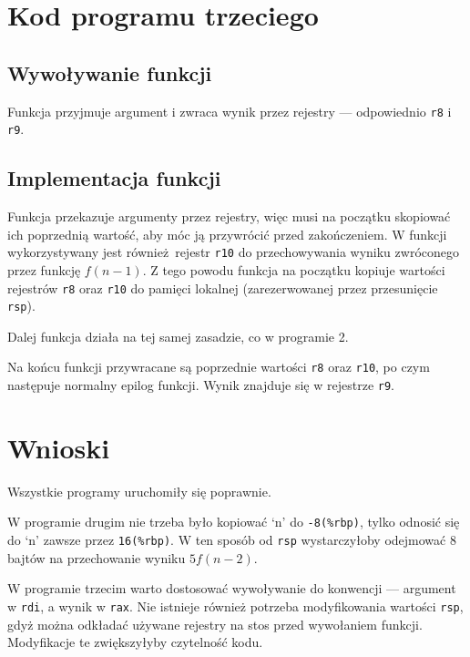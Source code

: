 \documentclass[polish, 11pt]{article}
\begin{document}
\section{Kod programu trzeciego}
	\subsection{Wywoływanie funkcji}

		\begin{minipage}{.5\textwidth}
			Funkcja przyjmuje argument i zwraca wynik przez rejestry --- odpowiednio \texttt{r8} i \texttt{r9}.
		\end{minipage}%
		\hspace{1cm}
		\begin{minipage}{.5\textwidth}
			
		\end{minipage}
	
	\subsection{Implementacja funkcji}
	
		\begin{minipage}{.5\textwidth}
			Funkcja przekazuje argumenty przez rejestry, więc musi na początku skopiować ich poprzednią wartość, aby móc ją przywrócić przed zakończeniem.
			W funkcji wykorzystywany jest również rejestr \texttt{r10} do przechowywania wyniku zwróconego przez funkcję \(f(n-1)\).
			Z tego powodu funkcja na początku kopiuje wartości rejestrów \texttt{r8} oraz \texttt{r10} do pamięci lokalnej (zarezerwowanej przez przesunięcie \texttt{rsp}).

			Dalej funkcja działa na tej samej zasadzie, co w programie 2.

			Na końcu funkcji przywracane są poprzednie wartości \texttt{r8} oraz \texttt{r10}, po czym następuje normalny epilog funkcji.
			Wynik znajduje się w rejestrze \texttt{r9}.

			\section{Wnioski}
	Wszystkie programy uruchomiły się poprawnie.

	W programie drugim nie trzeba było kopiować `n' do \texttt{-8(\%rbp)}, tylko odnosić się do `n' zawsze przez \texttt{16(\%rbp)}.
	W ten sposób od \texttt{rsp} wystarczyłoby odejmować 8 bajtów na przechowanie wyniku \(5f(n-2)\).

	W programie trzecim warto dostosować wywoływanie do konwencji --- argument w \texttt{rdi}, a wynik w \texttt{rax}.
	Nie istnieje również potrzeba modyfikowania wartości \texttt{rsp}, gdyż można odkładać używane rejestry na stos przed wywołaniem funkcji. Modyfikacje te zwiększyłyby czytelność kodu.
		\end{minipage}%
		\hspace{1cm}
		\begin{minipage}{.5\textwidth}
			
		\end{minipage}
\end{document}
